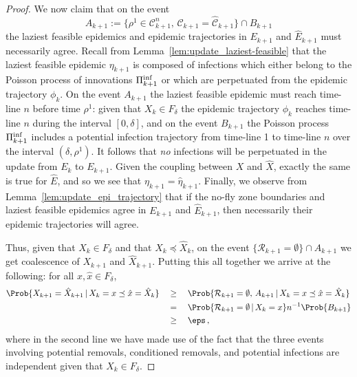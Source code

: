 \documentclass[]{article}
\newcommand{\Conditioned}{\mathcal{C}}
\newcommand{\Epidemic}{E}%
\newcommand{\Removals}{\mathcal{R}}
\newcommand{\Epi}{X}
\newcommand{\Poisson}{\Pi}
\newcommand{\PoissonInf}{\Poisson^\textup{inf}}
\newcommand{\faster}[1]{\hat{#1}}
\newcommand{\slower}[1]{#1}
\begin{document}
\begin{proof}
We now claim that on the event 
\[
A_{k+1}:=\{\rho^1\in\slower{\Conditioned}_{k+1}^n ,\,
\slower\Conditioned_{k+1} = \faster\Conditioned_{k+1}\}\cap B_{k+1}
\]
the laziest feasible epidemics and epidemic trajectories in \(\slower{\Epidemic}_{k+1}\) and \(\faster{\Epidemic}_{k+1}\) must necessarily agree. Recall from Lemma~\ref{lem:update_laziest-feasible} that the laziest feasible epidemic \(\slower\eta_{k+1}\) is composed of infections which either belong to the Poisson process of innovations \(\PoissonInf_{k+1}\) or which are perpetuated from the epidemic trajectory \(\slower\phi_k\). On the event \(A_{k+1}\) the laziest feasible epidemic must reach time-line \(n\) before time \(\rho^1\): given that \(\slower\Epi_k\in F_\delta\) the epidemic trajectory \(\phi_k\) reaches time-line \(n\) during the interval \([0,\delta]\), and on the event \(B_{k+1}\) the Poisson process \(\PoissonInf_{k+1}\) includes a potential infection trajectory from time-line 1 to time-line \(n\) over the interval \((\delta,\rho^1)\). It follows that \textit{no} infections will be perpetuated in the update from \(\slower\Epidemic_k\) to \(\slower\Epidemic_{k+1}\). Given the coupling between \(\slower\Epi\) and \(\faster\Epi\), exactly the same is true for \(\faster{\Epidemic}\), and so we see that \(\slower\eta_{k+1} = \faster \eta_{k+1}\). Finally, we observe from Lemma~\ref{lem:update_epi_trajectory} that if the no-fly zone boundaries and laziest feasible epidemics agree in \(\slower{\Epidemic}_{k+1}\) and \(\faster{\Epidemic}_{k+1}\), then necessarily their epidemic trajectories will agree. 

Thus, given that \(\slower\Epi_k\in F_\delta\) and that \(\slower\Epi_k\preceq\faster\Epi_k\), on the event \(\{\slower{\Removals}_{k+1}=\emptyset\} \cap A_{k+1}\) we get coalescence of \(\slower\Epi_{k+1}\) and \(\faster\Epi_{k+1}\). Putting this all together we arrive at the following: for all \(\slower{x},\faster{x}\in F_\delta\),
\begin{align*}
	\Prob{\slower{\Epi}_{k+1} = \faster{\Epi}_{k+1}\,|\, \slower{\Epi}_{k}=\slower{x} \preceq \faster{x} =\faster{\Epi}_k}  
	\quad&\ge\quad  \Prob{\slower{\Removals}_{k+1}=\emptyset,\,A_{k+1}  \,|\,\slower{\Epi}_{k}=\slower{x} \preceq \faster{x} =\faster{\Epi}_k} \\
	&=\quad \Prob{\slower{\Removals}_{k+1}=\emptyset\,|\, \slower{\Epi}_{k}=x} 
	n^{-1} \Prob{B_{k+1}} \\
	&\ge\quad \eps \,,
\end{align*}
where in the second line we have made use of the fact that the three events involving potential removals, conditioned removals, and potential infections are independent given that \(\slower{\Epi}_{k} \in F_\delta\).
\end{proof}
\end{document}
